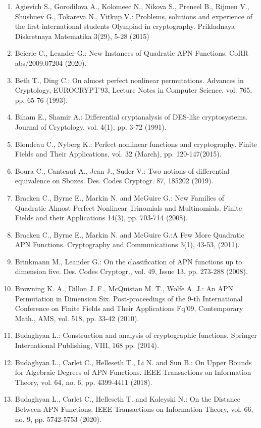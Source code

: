 \documentclass[10pt]{article}
\begin{document}
\begin{enumerate}
  \item Agievich S., Gorodilova A., Kolomeec N., Nikova S., Preneel B., Rijmen V., Shushuev G., Tokareva N., Vitkup V.: Problems, solutions and experience of the first international students Olympiad in cryptography. Prikladnaya Diskretnaya Matematika 3(29), 5-28 (2015)
  \item Beierle C., Leander G.: New Instances of Quadratic APN Functions. CoRR abs/2009.07204 (2020).
  \item Beth T., Ding C.: On almost perfect nonlinear permutations. Advances in Cryptology, EUROCRYPT'93, Lecture Notes in Computer Science, vol. 765, pp. 65-76 (1993).
  \item Biham E., Shamir A.: Differential cryptanalysis of DES-like cryptosystems. Journal of Cryptology, vol. 4(1), pp. 3-72 (1991).
  \item Blondeau C., Nyberg K.: Perfect nonlinear functions and cryptography. Finite Fields and Their Applications, vol. 32 (March), pp. 120-147(2015).
  \item Boura C., Canteaut A., Jean J., Suder V.: Two notions of differential equivalence on Sboxes. Des. Codes Cryptogr. 87, 185202 (2019).
  \item Bracken C., Byrne E., Markin N. and McGuire G.: New Families of Quadratic Almost Perfect Nonlinear Trinomials and Multinomials. Finite Fields and their Applications 14(3), pp. 703-714 (2008).
  \item Bracken C., Byrne E., Markin N. and McGuire G.:A Few More Quadratic APN Functions. Cryptography and Communications 3(1), 43-53, (2011).
  \item Brinkmann M., Leander G.: On the classification of APN functions up to dimension five. Des. Codes Cryptogr., vol. 49, Issue 13, pp. 273-288 (2008).
  \item Browning K. A., Dillon J. F., McQuistan M. T., Wolfe A. J.: An APN Permutation in Dimension Six. Post-proceedings of the 9-th International Conference on Finite Fields and Their Applications Fq'09, Contemporary Math., AMS, vol. 518, pp. 33-42 (2010).
  \item Budaghyan L.: Construction and analysis of cryptographic functions. Springer International Publishing, VIII, 168 pp. (2014).
  \item Budaghyan L., Carlet C., Helleseth T., Li N. and Sun B.: On Upper Bounds for Algebraic Degrees of APN Functions. IEEE Transactions on Information Theory, vol. 64, no. 6, pp. 4399-4411 (2018).
  \item Budaghyan L., Carlet C., Helleseth T. and Kaleyski N.: On the Distance Between APN Functions. IEEE Transactions on Information Theory, vol. 66, no. 9, pp. 5742-5753 (2020).

\end{enumerate}
\end{document}
